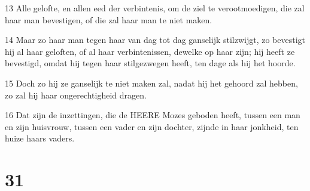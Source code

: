 \par 13 Alle gelofte, en allen eed der verbintenis, om de ziel te verootmoedigen, die zal haar man bevestigen, of die zal haar man te niet maken.
\par 14 Maar zo haar man tegen haar van dag tot dag ganselijk stilzwijgt, zo bevestigt hij al haar geloften, of al haar verbintenissen, dewelke op haar zijn; hij heeft ze bevestigd, omdat hij tegen haar stilgezwegen heeft, ten dage als hij het hoorde.
\par 15 Doch zo hij ze ganselijk te niet maken zal, nadat hij het gehoord zal hebben, zo zal hij haar ongerechtigheid dragen.
\par 16 Dat zijn de inzettingen, die de HEERE Mozes geboden heeft, tussen een man en zijn huisvrouw, tussen een vader en zijn dochter, zijnde in haar jonkheid, ten huize haars vaders.

\chapter{31}

